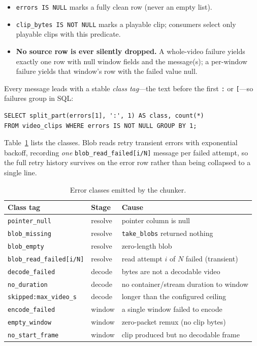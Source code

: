 \documentclass[11pt]{article}
\newcommand{\ct}[1]{\texttt{\small #1}}
\begin{document}
\begin{itemize}[itemsep=1pt,topsep=2pt]
  \item \ct{errors IS NULL} marks a fully clean row (never an empty list).
  \item \ct{clip\_bytes IS NOT NULL} marks a playable clip; consumers select
  only playable clips with this predicate.
  \item \textbf{No source row is ever silently dropped.} A whole-video failure
  yields exactly one row with null window fields and the message(s); a
  per-window failure yields that window's row with the failed value null.
\end{itemize}

Every message leads with a stable \emph{class tag}---the text before the first
\ct{:} or \ct{[}---so failures group in SQL:

\begin{lstlisting}[style=py]
SELECT split_part(errors[1], ':', 1) AS class, count(*)
FROM video_clips WHERE errors IS NOT NULL GROUP BY 1;
\end{lstlisting}

\noindent
Table~\ref{tab:classes} lists the classes. Blob reads retry transient errors with
exponential backoff, recording \emph{one} \ct{blob\_read\_failed[i/N]} message
per failed attempt, so the full retry history survives on the error row rather
than being collapsed to a single line.

\begin{table}[t]
\centering
\caption{Error classes emitted by the chunker.}
\label{tab:classes}
\small
\begin{tabular}{@{}lll@{}}
\toprule
\textbf{Class tag} & \textbf{Stage} & \textbf{Cause} \\
\midrule
\ct{pointer\_null}        & resolve & pointer column is null \\
\ct{blob\_missing}        & resolve & \ct{take\_blobs} returned nothing \\
\ct{blob\_empty}          & resolve & zero-length blob \\
\ct{blob\_read\_failed[i/N]} & resolve & read attempt $i$ of $N$ failed (transient) \\
\ct{decode\_failed}       & decode  & bytes are not a decodable video \\
\ct{no\_duration}         & decode  & no container/stream duration to window \\
\ct{skipped:max\_video\_s} & decode  & longer than the configured ceiling \\
\ct{encode\_failed}       & window  & a single window failed to encode \\
\ct{empty\_window}        & window  & zero-packet remux (no clip bytes) \\
\ct{no\_start\_frame}     & window  & clip produced but no decodable frame \\
\bottomrule
\end{tabular}
\end{table}
\end{document}
